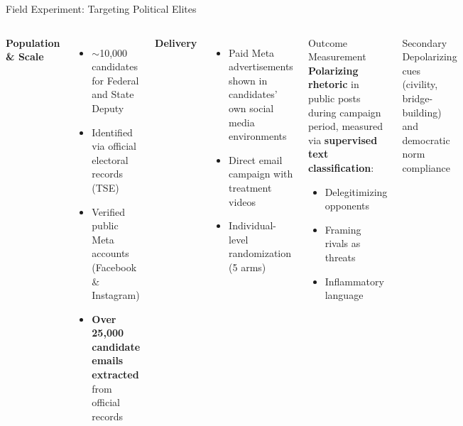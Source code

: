 \documentclass[aspectratio=169]{beamer}
\begin{document}
\begin{frame}{Field Experiment: Targeting Political Elites}
  \begin{columns}[T]
      \textbf{Population \& Scale}
      \begin{itemize}
        \item $\sim$10,000 candidates for Federal and State Deputy
        \item Identified via official electoral records (TSE)
        \item Verified public Meta accounts (Facebook \& Instagram)
        \item \textbf{Over 25,000 candidate emails extracted} from official records
      \end{itemize}
      \vspace{0.4em}
      \textbf{Delivery}
      \begin{itemize}
        \item Paid Meta advertisements shown in candidates' own social media environments
        \item Direct email campaign with treatment videos
        \item Individual-level randomization (5 arms)
      \end{itemize}
      \begin{block}{Outcome Measurement}
        \vspace{0.3em}
        \textbf{Polarizing rhetoric} in public posts during campaign period, measured via \textbf{supervised text classification}:
        \begin{itemize}
          \item Delegitimizing opponents
          \item Framing rivals as threats
          \item Inflammatory language
        \end{itemize}
      \end{block}
      \vspace{0.3em}
      \begin{exampleblock}{Secondary}
        Depolarizing cues (civility, bridge-building) and democratic norm compliance
      \end{exampleblock}
  \end{columns}
\end{frame}
\end{document}

